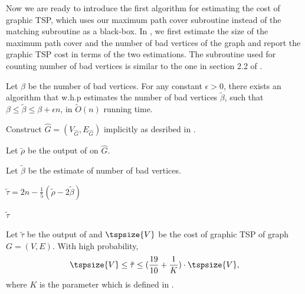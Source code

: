 Now we are ready to introduce the first algorithm for estimating the cost of graphic TSP, which uses our maximum path cover subroutine instead of the matching subroutine as a black-box. In , we first estimate the size of the maximum path cover and the number of bad vertices of the graph and report the graphic TSP cost in terms of the two estimations. The subroutine used for counting number of bad vertices is similar to the one in section 2.2 of \cite{chen2020}.

\begin{lemma}\label{lem: bad-vertices-estimator}
Let $\beta$ be the number of bad vertices. For any constant $\epsilon > 0$, there exists an algorithm that w.h.p estimates the number of bad vertices $\tilde{\beta}$, such that $\beta \leq \tilde{\beta} \leq \beta + \epsilon n $, in $\tilde{O}(n)$ running time.
\end{lemma}

\begin{algorithm}
\caption{First algorithm for graphic TSP.}
\label{alg: graphic-tsp}
    Construct $\hat{G} = (V_{\hat{G}}, E_{\hat{G}})$ implicitly as desribed in .
    
    Let $\tilde{\rho}$ be the output of  on $\hat{G}$.
    
    Let $\tilde{\beta}$ be the estimate of number of bad vertices.
    
    $\tilde{\tau} = 2n - \frac{1}{5}(\tilde{\rho} - 2\tilde{\beta})$
    
    \Return $\tilde{\tau}$
\end{algorithm}

\begin{lemma}\label{lem: graphic-tsp-approx1}
Let $\tilde{\tau}$ be the output of  and $\tspsize{V}$ be the cost of graphic TSP of graph $G = (V, E)$. With high probability,
$$
\tspsize{V} \leq \tilde{\tau} \leq (\frac{19}{10} + \frac{1}{K})\cdot \tspsize{V},
$$
where $K$ is the parameter which is defined in \algtwo{}.
\end{lemma}





